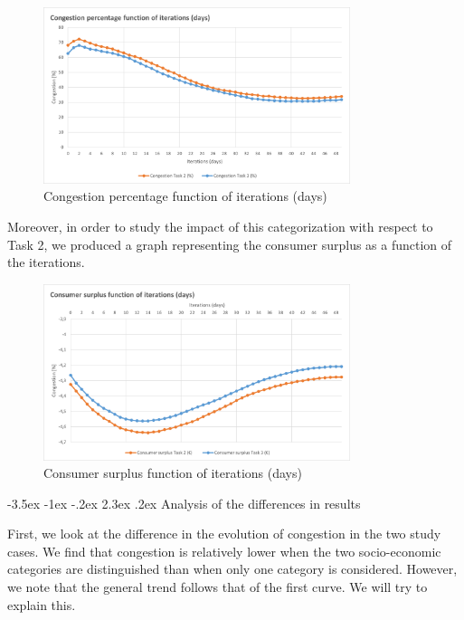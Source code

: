 \documentclass[a4paper, 12pt,oneside]{article}
\makeatletter
\renewcommand{\subsection}{\@startsection {subsection}{1}{\z@}%
             {-3.5ex \@plus -1ex \@minus -.2ex}%
             {2.3ex \@plus.2ex}%
             {\normalfont\normalsize\bfseries}}
\makeatother
\begin{document}
\begin{figure}[H]
    \centering
    \includegraphics[width=0.8\textwidth]{Images/Step3/Congestion_percentage_function_iterations.png}
    \caption{Congestion percentage function of iterations (days)}
    \label{fig:Congestion percentage function of iterations (days)}
\end{figure}

Moreover, in order to study the impact of this categorization with respect to Task 2, we produced a graph representing the consumer surplus as a function of the iterations.

\begin{figure}[H]
    \centering
    \includegraphics[width=0.8\textwidth]{Images/Step3/Consumer_surplus_function_iterations.png}
    \caption{Consumer surplus function of iterations (days)}
    \label{fig:Consumer surplus function of iterations (days)}
\end{figure}


\subsection{Analysis of the differences in results}

First, we look at the difference in the evolution of congestion in the two study cases. We find that congestion is relatively lower when the two socio-economic categories are distinguished than when only one category is considered. However, we note that the general trend follows that of the first curve. We will try to explain this.\\
\end{document}
